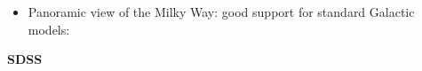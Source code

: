 \documentclass[letterpaper,landscape]{slides}
\begin{document}
\begin{slide}
{\begin{minipage}[t]{17cm}
\begin{itemize}
\item Panoramic view of the Milky Way:
{\color{blue} good support for standard Galactic models:}
\end{itemize}     
\vskip 0.25in
\vskip 0.1in
\vskip -4.25in
{\color{red} \bf \hskip 1.7in SDSS}
\end{minipage}}
\vfill 
\end{slide}
\end{document}
